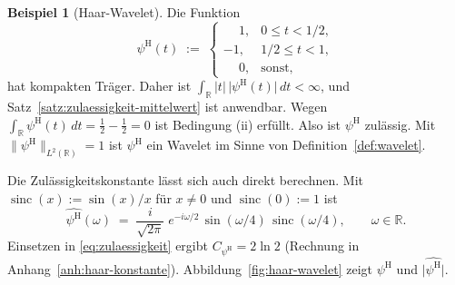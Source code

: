 \documentclass[a4paper,11pt,bibliography=totoc,listof=totoc,headinclude=true,cleardoublepage=empty,oneside]{scrbook}
\theoremstyle{plain}
\theoremstyle{definition}
\newtheorem{Beispiel}[Satz]{Beispiel}
\newcommand{\R}{\mathbb{R}}
\newcommand{\LZwei}{L^2(\R)}
\newcommand{\norm}[1]{\lVert #1 \rVert}
\begin{document}
\begin{Beispiel}[Haar-Wavelet]
\label{bsp:haar}
Die Funktion
\[
  \psi^{\mathrm{H}}(t) \;:=\;
  \begin{cases}
    \phantom{-}1, & 0 \le t < 1/2,\\
    -1, & 1/2 \le t < 1,\\
    \phantom{-}0, & \text{sonst,}
  \end{cases}
\]
hat kompakten Träger. Daher ist
$\int_\R \lvert t\rvert\,\lvert\psi^{\mathrm H}(t)\rvert\,dt < \infty$, und
Satz~\ref{satz:zulaessigkeit-mittelwert} ist anwendbar. Wegen
$\int_\R \psi^{\mathrm H}(t)\,dt = \tfrac12 - \tfrac12 = 0$ ist Bedingung (ii)
erfüllt. Also ist $\psi^{\mathrm H}$ zulässig. Mit
$\norm{\psi^{\mathrm H}}_{\LZwei} = 1$ ist $\psi^{\mathrm H}$ ein Wavelet im
Sinne von Definition~\ref{def:wavelet}.

Die Zulässigkeitskonstante lässt sich auch direkt berechnen. Mit
$\operatorname{sinc}(x) := \sin(x)/x$ für $x \neq 0$ und
$\operatorname{sinc}(0) := 1$ ist
\begin{equation}
\label{eq:haar-fourier}
  \widehat{\psi^{\mathrm{H}}}(\omega)
  \;=\; \frac{i}{\sqrt{2\pi}}\; e^{-i\omega/2}\,\sin(\omega/4)\,\operatorname{sinc}(\omega/4),
  \qquad \omega \in \R .
\end{equation}
Einsetzen in \eqref{eq:zulaessigkeit} ergibt $C_{\psi^{\mathrm{H}}} = 2\ln 2$
\cite[Kap.~1.1, Beispiel~(1)]{lmr} %
(Rechnung in Anhang~\ref{anh:haar-konstante}).
Abbildung~\ref{fig:haar-wavelet} zeigt $\psi^{\mathrm H}$ und
$\lvert\widehat{\psi^{\mathrm H}}\rvert$.
\end{Beispiel}
 
\end{document}
